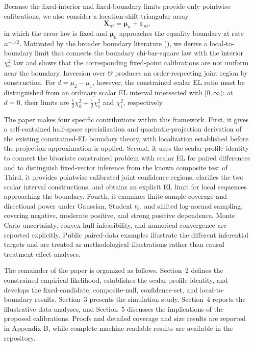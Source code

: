 \documentclass[11pt]{article}
\theoremstyle{remark}
\begin{document}
Because the fixed-interior and fixed-boundary limits provide only pointwise calibrations, we also consider a location-shift triangular array
$$
\boldsymbol{X}_{ni}=\boldsymbol{\mu}_n+\boldsymbol{\varepsilon}_{ni},
$$
in which the error law is fixed and $\boldsymbol{\mu}_n$ approaches the equality boundary at rate $n^{-1/2}$. Motivated by the broader boundary literature (\citet{andrews2001testing,balabdaoui2009likelihood}), we derive a local-to-boundary limit that connects the boundary chi-bar-square law with the interior $\chi_2^2$ law and shows that the corresponding fixed-point calibrations are not uniform near the boundary. Inversion over $\Theta$ produces an order-respecting joint region by construction. For $d=\mu_2-\mu_1$, however, the constrained scalar EL ratio must be distinguished from an ordinary scalar EL interval intersected with $[0,\infty)$: at $d=0$, their limits are $\tfrac12\chi_0^2+\tfrac12\chi_1^2$ and $\chi_1^2$, respectively.


The paper makes four specific contributions within this framework. First, it gives a self-contained half-space specialization and quadratic-projection derivation of the existing constrained-EL boundary theory, with localization established before the projection approximation is applied. Second, it uses the scalar profile identity to connect the bivariate constrained problem with scalar EL for paired differences and to distinguish fixed-vector inference from the known composite test of \citet{el1996empirical}. Third, it provides pointwise calibrated joint confidence regions, clarifies the two scalar interval constructions, and obtains an explicit EL limit for local sequences approaching the boundary. \citet{chen2011empirical} Fourth, it examines finite-sample coverage and directional power under Gaussian, Student $t_5$, and shifted log-normal sampling, covering negative, moderate positive, and strong positive dependence. Monte Carlo uncertainty, convex-hull infeasibility, and numerical convergence are reported explicitly. Public paired-data examples illustrate the different inferential targets and are treated as methodological illustrations rather than causal treatment-effect analyses.

The remainder of the paper is organized as follows. Section~2 defines the constrained empirical likelihood, establishes the scalar profile identity, and develops the fixed-candidate, composite-null, confidence-set, and local-to-boundary results. Section~3 presents the simulation study. Section~4 reports the illustrative data analyses, and Section~5 discusses the implications of the proposed calibrations. Proofs and detailed coverage and size results are reported in Appendix B, while complete machine-readable results are available in the repository.
\end{document}
